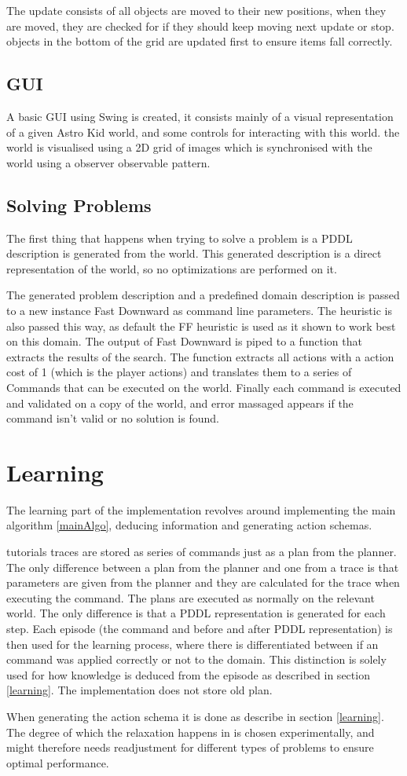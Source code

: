 	The update consists of all objects are moved to their new positions, when they are moved, they are checked for if they should keep moving next update or stop. objects in the bottom of the grid are updated first to ensure items fall correctly.
	
	
	\subsection{GUI}
	A basic GUI using Swing is created, it consists mainly of a visual representation of a given Astro Kid world, and some controls for interacting with this world. the world is visualised using a 2D grid of images which is synchronised with the world using a observer observable pattern.
	
	\subsection{Solving Problems}
	The first thing that happens when trying to solve a problem is a PDDL description is generated from the world. This generated description is a direct representation of the world, so no optimizations are performed on it.

	The generated problem description and a predefined domain description is passed to a new instance Fast Downward as command line parameters. The heuristic is also passed this way, as default the FF heuristic is used as it shown to work best on this domain. The output of Fast Downward is piped to a function that extracts the results of the search. The function extracts all actions with a action cost of 1 (which is the player actions) and translates them to a series of Commands that can be executed on the world. Finally each command is executed and validated on a copy of the world, and error massaged appears if the command isn't valid or no solution is found. 
	
\section{Learning}
	The learning part of the implementation revolves around implementing the main algorithm \ref{mainAlgo}, deducing information and generating action schemas.
	

	
	tutorials traces are stored as series of commands just as a plan from the planner. The only difference between a plan from the planner and one from a trace is that parameters are given from the planner and they are calculated for the trace when executing the command. The plans are executed as normally on the relevant world. The only difference is that a PDDL representation is generated for each step. Each episode (the command and before and after PDDL representation) is then used for the learning process, where there is differentiated between if an command was applied correctly or not to the domain. This distinction is solely used for how knowledge is deduced from the episode as described in section \ref{learning}. The implementation does not store old plan.
	

	When generating the action schema it is done as describe in section \ref{learning}.	The degree of which the relaxation happens in is chosen experimentally, and might therefore needs readjustment for different types of problems to ensure optimal performance.
	